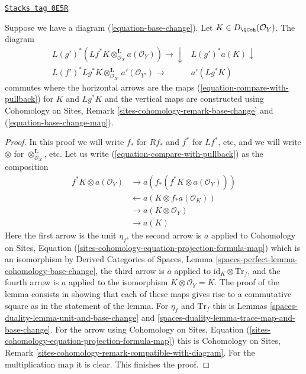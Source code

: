 \begin{lemma}
\label{spaces-duality-lemma-restriction-compare-with-pullback}
\href{https://stacks.math.columbia.edu/tag/0E5R}{\texttt{Stacks tag 0E5R}}

Suppose we have a diagram (\ref{equation-base-change}).
Let $K \in D_\QCoh(\mathcal{O}_Y)$. The diagram
$$
\begin{array}{cc}L(g')^*(Lf^*K \otimes^\mathbf{L}_{\mathcal{O}_X} a(\mathcal{O}_Y))
\longrightarrow\downarrow & L(g')^*a(K) \downarrow \\ L(f')^*Lg^*K \otimes_{\mathcal{O}_{X'}}^\mathbf{L} a'(\mathcal{O}_{Y'})
\longrightarrow & a'(Lg^*K)\end{array}
$$
commutes where the horizontal arrows are the maps
(\ref{equation-compare-with-pullback}) for $K$ and $Lg^*K$
and the vertical maps are constructed using
Cohomology on Sites, Remark \ref{sites-cohomology-remark-base-change} and
(\ref{equation-base-change-map}).
\end{lemma}

\begin{proof}
In this proof we will write $f_*$ for $Rf_*$ and $f^*$ for $Lf^*$, etc,
and we will write $\otimes$ for $\otimes^\mathbf{L}_{\mathcal{O}_X}$, etc.
Let us write (\ref{equation-compare-with-pullback}) as the composition
\begin{align*}
f^*K \otimes a(\mathcal{O}_Y)
& \to
a(f_*(f^*K \otimes a(\mathcal{O}_Y))) \\
& \leftarrow
a(K \otimes f_*a(\mathcal{O}_K)) \\
& \to
a(K \otimes \mathcal{O}_Y) \\
& \to
a(K)
\end{align*}
Here the first arrow is the unit $\eta_f$, the second arrow is $a$
applied to Cohomology on Sites, Equation
(\ref{sites-cohomology-equation-projection-formula-map}) which is an
isomorphism by Derived Categories of Spaces, Lemma
\ref{spaces-perfect-lemma-cohomology-base-change}, the third arrow is
$a$ applied to $\text{id}_K \otimes \text{Tr}_f$, and the fourth
arrow is $a$ applied to the isomorphism $K \otimes \mathcal{O}_Y = K$.
The proof of the lemma consists in showing that each of these
maps gives rise to a commutative square as in the statement of the lemma.
For $\eta_f$ and $\text{Tr}_f$ this is
Lemmas \ref{spaces-duality-lemma-unit-and-base-change} and
\ref{spaces-duality-lemma-trace-map-and-base-change}.
For the arrow using Cohomology on Sites, Equation
(\ref{sites-cohomology-equation-projection-formula-map})
this is Cohomology on Sites, Remark
\ref{sites-cohomology-remark-compatible-with-diagram}.
For the multiplication map it is clear. This finishes the proof.
\end{proof}

